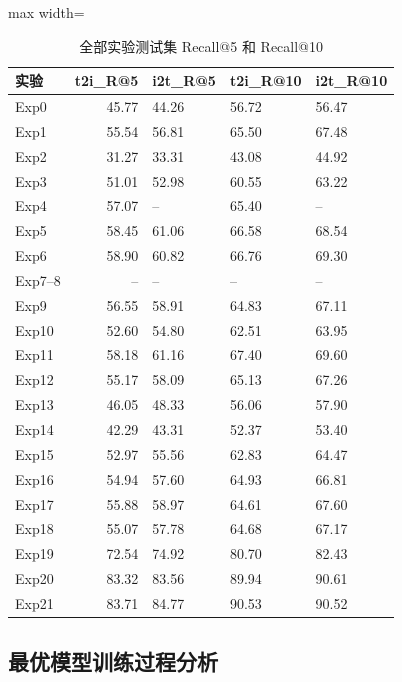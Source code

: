 \documentclass[12pt,a4paper]{article}
\begin{document}
\begin{table}[H]
\centering
\caption{全部实验测试集 Recall@5 和 Recall@10}
\begin{adjustbox}{max width=\textwidth}
\small
\begin{tabular}{lrlll}
\toprule
\textbf{实验} & \textbf{t2i\_R@5} & \textbf{i2t\_R@5} & \textbf{t2i\_R@10} & \textbf{i2t\_R@10} \\
\midrule
Exp0 & 45.77 & 44.26 & 56.72 & 56.47 \\
\rowcolor{blue!15}
Exp1 & 55.54 & 56.81 & 65.50 & 67.48 \\
Exp2 & 31.27 & 33.31 & 43.08 & 44.92 \\
Exp3 & 51.01 & 52.98 & 60.55 & 63.22 \\
Exp4 & 57.07 & -- & 65.40 & -- \\
Exp5 & 58.45 & 61.06 & 66.58 & 68.54 \\
\rowcolor{yellow!30}
Exp6 & 58.90 & 60.82 & 66.76 & 69.30 \\
Exp7--8 & -- & -- & -- & -- \\
Exp9 & 56.55 & 58.91 & 64.83 & 67.11 \\
Exp10 & 52.60 & 54.80 & 62.51 & 63.95 \\
Exp11 & 58.18 & 61.16 & 67.40 & 69.60 \\
Exp12 & 55.17 & 58.09 & 65.13 & 67.26 \\
Exp13 & 46.05 & 48.33 & 56.06 & 57.90 \\
Exp14 & 42.29 & 43.31 & 52.37 & 53.40 \\
Exp15 & 52.97 & 55.56 & 62.83 & 64.47 \\
Exp16 & 54.94 & 57.60 & 64.93 & 66.81 \\
Exp17 & 55.88 & 58.97 & 64.61 & 67.60 \\
Exp18 & 55.07 & 57.78 & 64.68 & 67.17 \\
\rowcolor{green!30}
Exp19 & 72.54 & 74.92 & 80.70 & 82.43 \\
Exp20 & 83.32 & 83.56 & 89.94 & 90.61 \\
\rowcolor{orange!30}
Exp21 & 83.71 & 84.77 & 90.53 & 90.52 \\
\bottomrule
\end{tabular}
\end{adjustbox}
\end{table}

\subsection{最优模型训练过程分析}
\end{document}
